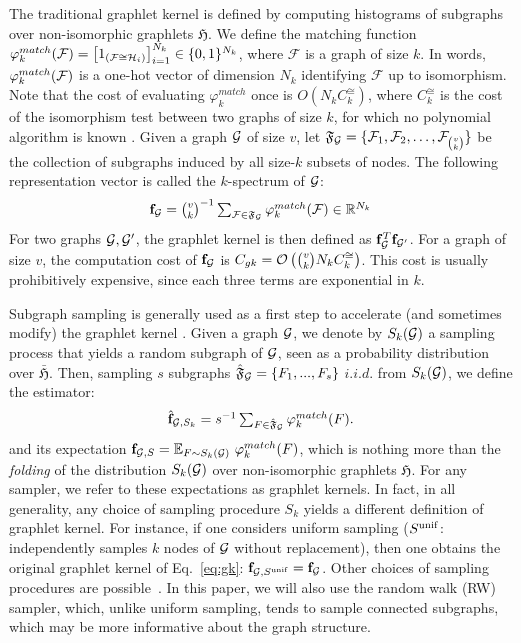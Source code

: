 \documentclass{article}
\begin{document}
The traditional graphlet kernel is defined by computing histograms of subgraphs over non-isomorphic graphlets $\mathfrak{H}$. We define the matching function $\varphi_k^{match}(\mathcal{F}) = \left[ 1_{(\mathcal{F} \cong \mathcal{H}_i)}\right]_{i=1}^{N_k} \in \{0,1\}^{N_k}$, where $\mathcal{F}$ is a graph of size $k$. In words, $\varphi^{match}_k(\mathcal{F})$ is a one-hot vector of dimension $N_k$ identifying $\mathcal{F}$ up to isomorphism. Note that the cost of evaluating $\varphi_k^{match}$ once is $O\left(N_k C^{\cong}_k\right)$, where $C^{\cong}_k$ is the cost of the isomorphism test between two graphs of size $k$, for which no polynomial algorithm is known \cite{isomorphism_np}. 
%
Given a graph $\mathcal{G}$ of size $v$, let $\mathfrak{F}_{\mathcal{G}}=\{\mathcal{F}_1,\mathcal{F}_2,\ldots,\mathcal{F}_{\binom{v}{k}}\}$ be the collection of subgraphs induced by all size-$k$ subsets of nodes. The following representation vector is called the $k$-spectrum of $\mathcal{G}$:
\begin{equation}
\label{eq:gk}
\mathsmaller{\mathbf{f}_\G=\binom{v}{k}^{-1}\sum_{\mathcal{F}\in\mathfrak{F}_\mathcal{G}} \match (\mathcal{F}) \in \R^{N_k}}
\end{equation}
For two graphs $\mathcal{G},\mathcal{G}'$, the graphlet kernel \cite{graphlet_kernel} is then defined as $\mathbf{f}_{\mathcal{G}}^T\mathbf{f}_{\mathcal{G}'}$. %
For a graph of size $v$, the computation cost of $\mathbf{f}_{\mathcal{G}}$ is $C_{gk}= \mathcal{O}\left(\tbinom{v}{k}N_k C^{\cong}_k\right)$. This cost is usually prohibitively expensive, since each three terms are exponential in $k$.

Subgraph sampling is generally used as a first step to accelerate (and sometimes modify) the graphlet kernel \cite{graphlet_kernel}. Given a graph $\mathcal{G}$, we denote by $S_k(\mathcal{G})$ a sampling process that yields a random subgraph of $\mathcal{G}$, seen as a probability distribution over $\bar{\mathfrak{H}}$. %
Then, sampling $s$ subgraphs $\hat{\mathfrak{F}}_{\mathcal{G}} = \{F_1,...,F_s\}$ $i.i.d.$ from $S_k(\mathcal{G})$, we define the estimator:
\begin{align}
	\label{eq:fhat_unif}
	\mathsmaller{\hat{\mathbf{f}}_{\mathcal{G},S_k} =s^{-1}\sum_{F\in\hat{\mathfrak{F}}_\G} \varphi^{match}_k(F).}
\end{align}
and its expectation $\mathbf{f}_{\mathcal{G},S} = \mathbb{E}_{F \sim S_k(\mathcal{G})} ~\varphi^{match}_k(F)$, which is nothing more than the \emph{folding} of the distribution $S_k(\mathcal{G})$ over non-isomorphic graphlets $\mathfrak{H}$. For any sampler, we refer to these expectations as graphlet kernels. In fact, in all generality, any choice of sampling procedure $S_k$ yields a different definition of graphlet kernel. For instance, if one considers uniform sampling ($S^{\rm unif}$: independently samples $k$ nodes of $\mathcal{G}$ without replacement), then one obtains the original graphlet kernel of Eq.~\eqref{eq:gk}: $\mathbf{f}_{\mathcal{G}, S^{\rm unif}} = \mathbf{f}_{\mathcal{G}}$. Other choices of sampling procedures are possible~\cite{leskovec2006sampling}. In this paper, we will also use the random walk (RW) sampler, which, unlike uniform sampling, tends to sample connected subgraphs, which may be more informative about the graph structure. 
\end{document}
